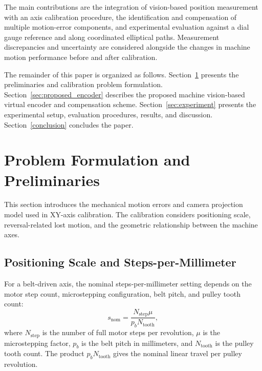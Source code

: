 \documentclass[journal]{IEEEtran}
\begin{document}
The main contributions are the integration of
vision-based position measurement with an axis
calibration procedure, the identification and
compensation of multiple motion-error components,
and experimental evaluation against a dial gauge
reference and along coordinated elliptical paths.
Measurement discrepancies and uncertainty are
considered alongside the changes in machine motion
performance before and after calibration.

The remainder of this paper is organized as follows.
Section~\ref{sec:preliminaries} presents the preliminaries
and calibration problem formulation.
Section~\ref{sec:proposed_encoder} describes the proposed
machine vision-based virtual encoder and compensation scheme.
Section~\ref{sec:experiment} presents the experimental setup,
evaluation procedures, results, and discussion.
Section~\ref{conclusion} concludes the paper.



\section{Problem Formulation and Preliminaries}
\label{sec:preliminaries}

This section introduces the mechanical motion errors
and camera projection model used in XY-axis calibration.
The calibration considers positioning scale,
reversal-related lost motion, and the geometric
relationship between the machine axes.

\subsection{Positioning Scale and Steps-per-Millimeter}

For a belt-driven axis, the nominal steps-per-millimeter
setting depends on the motor step count, microstepping
configuration, belt pitch, and pulley tooth count:
\begin{equation}
\label{eq:nominal_steps_per_mm}
s_{\mathrm{nom}}
=
\frac{N_{\mathrm{step}}\mu}
{p_b N_{\mathrm{tooth}}},
\end{equation}
where $N_{\mathrm{step}}$ is the number of full motor
steps per revolution, $\mu$ is the microstepping factor,
$p_b$ is the belt pitch in millimeters, and
$N_{\mathrm{tooth}}$ is the pulley tooth count.
The product $p_b N_{\mathrm{tooth}}$ gives the
nominal linear travel per pulley revolution.
\end{document}
